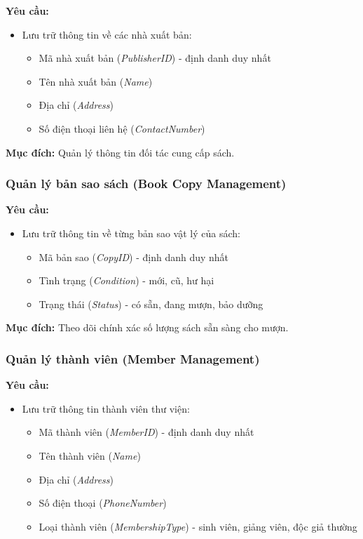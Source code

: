 \documentclass[12pt,a4paper]{article}
\newcommand{\attr}[1]{\textit{#1}}
\begin{document}
\textbf{Yêu cầu:}
\begin{itemize}
    \item Lưu trữ thông tin về các nhà xuất bản:
    \begin{itemize}
        \item Mã nhà xuất bản (\attr{PublisherID}) - định danh duy nhất
        \item Tên nhà xuất bản (\attr{Name})
        \item Địa chỉ (\attr{Address})
        \item Số điện thoại liên hệ (\attr{ContactNumber})
    \end{itemize}
\end{itemize}

\textbf{Mục đích:} Quản lý thông tin đối tác cung cấp sách.

\subsubsection{Quản lý bản sao sách (Book Copy Management)}

\textbf{Yêu cầu:}
\begin{itemize}
    \item Lưu trữ thông tin về từng bản sao vật lý của sách:
    \begin{itemize}
        \item Mã bản sao (\attr{CopyID}) - định danh duy nhất
        \item Tình trạng (\attr{Condition}) - mới, cũ, hư hại
        \item Trạng thái (\attr{Status}) - có sẵn, đang mượn, bảo dưỡng
    \end{itemize}
\end{itemize}

\textbf{Mục đích:} Theo dõi chính xác số lượng sách sẵn sàng cho mượn.

\subsubsection{Quản lý thành viên (Member Management)}

\textbf{Yêu cầu:}
\begin{itemize}
    \item Lưu trữ thông tin thành viên thư viện:
    \begin{itemize}
        \item Mã thành viên (\attr{MemberID}) - định danh duy nhất
        \item Tên thành viên (\attr{Name})
        \item Địa chỉ (\attr{Address})
        \item Số điện thoại (\attr{PhoneNumber})
        \item Loại thành viên (\attr{MembershipType}) - sinh viên, giảng viên, độc giả thường
    \end{itemize}
\end{itemize}
\end{document}
